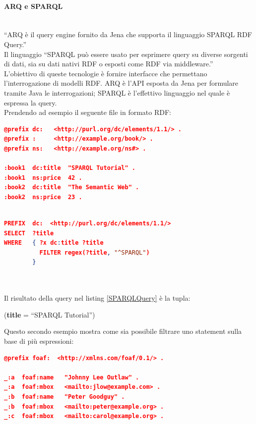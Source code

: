 \documentclass[12pt,a4paper,twoside]{book}
\begin{document}
\paragraph{ARQ e SPARQL}\mbox{}\\
``ARQ è il query engine fornito da Jena che supporta il linguaggio SPARQL RDF Query.''\cite{Jena}\\
Il linguaggio ``SPARQL può essere usato per esprimere query su diverse sorgenti di dati, sia su dati nativi RDF o esposti come RDF via middleware.''\cite{SPARQL}\\
L'obiettivo di queste tecnologie è fornire interfacce che permettano l'interrogazione di modelli RDF. ARQ è l'API esposta da Jena per formulare tramite Java le interrogazioni; SPARQL è l'effettivo linguaggio nel quale è espressa la query.\\
Prendendo ad esempio il seguente file in formato RDF:\\

\begin{lstlisting}[language=json,firstnumber=1,caption={File sul quale si vuole eseguire una query},captionpos=b,label=SPARQLRDF]
@prefix dc:   <http://purl.org/dc/elements/1.1/> .
@prefix :     <http://example.org/book/> .
@prefix ns:   <http://example.org/ns#> .

:book1  dc:title  "SPARQL Tutorial" .
:book1  ns:price  42 .
:book2  dc:title  "The Semantic Web" .
:book2  ns:price  23 .

\end{lstlisting}
\begin{lstlisting}[language=json,firstnumber=1,caption={Query SPARQL per il recupero dei titoli che iniziano per SPARQL},captionpos=b,label=SPARQLQuery]

PREFIX  dc:  <http://purl.org/dc/elements/1.1/>
SELECT  ?title
WHERE   { ?x dc:title ?title
          FILTER regex(?title, "^SPARQL") 
        }
\end{lstlisting}\mbox{}\\ \\  
Il risultato della query nel listing \ref{SPARQLQuery} è la tupla:
\begin{center} (\textbf{title} = ``SPARQL Tutorial'')\end{center}
Questo secondo esempio mostra come sia possibile filtrare uno statement sulla base di più espressioni:\\
\begin{lstlisting}[language=json,firstnumber=1,caption={File sul quale si vuole eseguire una query},captionpos=b,label=SPARQLRDF2]
@prefix foaf:  <http://xmlns.com/foaf/0.1/> .

_:a  foaf:name   "Johnny Lee Outlaw" .
_:a  foaf:mbox   <mailto:jlow@example.com> .
_:b  foaf:name   "Peter Goodguy" .
_:b  foaf:mbox   <mailto:peter@example.org> .
_:c  foaf:mbox   <mailto:carol@example.org> .
\end{lstlisting}\mbox{}
\end{document}
